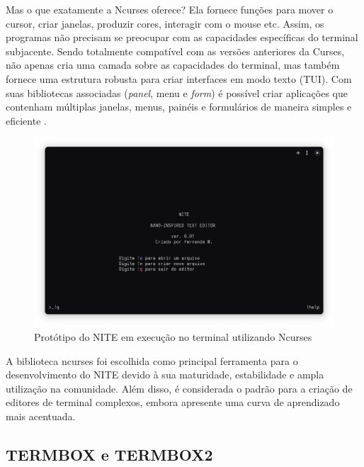 \vspace{0.4cm}

\vspace{0.4cm}

Mas o que exatamente a Ncurses oferece? Ela fornece funções para mover o cursor,
criar janelas, produzir cores, interagir com o mouse etc. Assim, os programas
não precisam se preocupar com as capacidades específicas do terminal subjacente.
Sendo totalmente compatível com as versões anteriores da Curses, não apenas cria
uma camada sobre as capacidades do terminal, mas também fornece uma estrutura robusta
para criar interfaces em modo texto (TUI). Com suas bibliotecas associadas (\textit{panel},
menu e \textit{form}) é possível criar aplicações que contenham múltiplas janelas,
menus, painéis e formulários de maneira simples e eficiente \cite{ncurses_howto}.

\FloatBarrier
\begin{figure}[!htbp]
    \centering
    \caption{Protótipo do NITE em execução no terminal utilizando Ncurses}
    \includegraphics[scale=0.3]{imagens/NITE.png}
\end{figure}
\FloatBarrier

A biblioteca ncurses foi escolhida como principal ferramenta para o
desenvolvimento do NITE devido à sua maturidade, estabilidade e ampla utilização
na comunidade. Além disso, é considerada o padrão para a criação de editores de terminal
complexos, embora apresente uma curva de aprendizado mais acentuada.

\subsection{TERMBOX e TERMBOX2}

